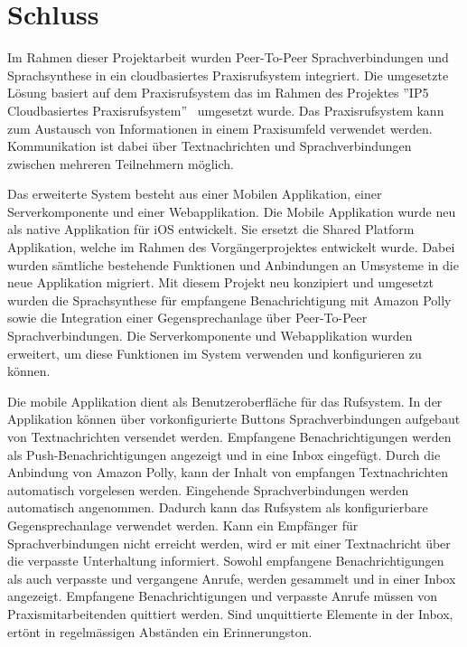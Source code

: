 \section{Schluss}

Im Rahmen dieser Projektarbeit wurden Peer-To-Peer Sprachverbindungen und Sprachsynthese in ein cloudbasiertes Praxisrufsystem integriert.
Die umgesetzte Lösung basiert auf dem Praxisrufsystem das im Rahmen des Projektes ''IP5 Cloudbasiertes Praxisrufsystem''~\cite{ip5} umgesetzt wurde.
Das Praxisrufsystem kann zum Austausch von Informationen in einem Praxisumfeld verwendet werden.
Kommunikation ist dabei über Textnachrichten und Sprachverbindungen zwischen mehreren Teilnehmern möglich.

Das erweiterte System besteht aus einer Mobilen Applikation, einer Serverkomponente und einer Webapplikation.
Die Mobile Applikation wurde neu als native Applikation für iOS entwickelt.
Sie ersetzt die Shared Platform Applikation, welche im Rahmen des Vorgängerprojektes entwickelt wurde.
Dabei wurden sämtliche bestehende Funktionen und Anbindungen an Umsysteme in die neue Applikation migriert.
Mit diesem Projekt neu konzipiert und umgesetzt wurden die Sprachsynthese für empfangene Benachrichtigung mit Amazon Polly sowie die Integration einer Gegensprechanlage über Peer-To-Peer Sprachverbindungen.
Die Serverkomponente und Webapplikation wurden erweitert, um diese Funktionen im System verwenden und konfigurieren zu können.

Die mobile Applikation dient als Benutzeroberfläche für das Rufsystem.
In der Applikation können über vorkonfigurierte Buttons Sprachverbindungen aufgebaut von Textnachrichten versendet werden.
Empfangene Benachrichtigungen werden als Push-Benachrichtigungen angezeigt und in eine Inbox eingefügt.
Durch die Anbindung von Amazon Polly, kann der Inhalt von empfangen Textnachrichten automatisch vorgelesen werden.
Eingehende Sprachverbindungen werden automatisch angenommen.
Dadurch kann das Rufsystem als konfigurierbare Gegensprechanlage verwendet werden.
Kann ein Empfänger für Sprachverbindungen nicht erreicht werden, wird er mit einer Textnachricht über die verpasste Unterhaltung informiert.
Sowohl empfangene Benachrichtigungen als auch verpasste und vergangene Anrufe, werden gesammelt und in einer Inbox angezeigt.
Empfangene Benachrichtigungen und verpasste Anrufe müssen von Praxismitarbeitenden quittiert werden.
Sind unquittierte Elemente in der Inbox, ertönt in regelmässigen Abständen ein Erinnerungston.

